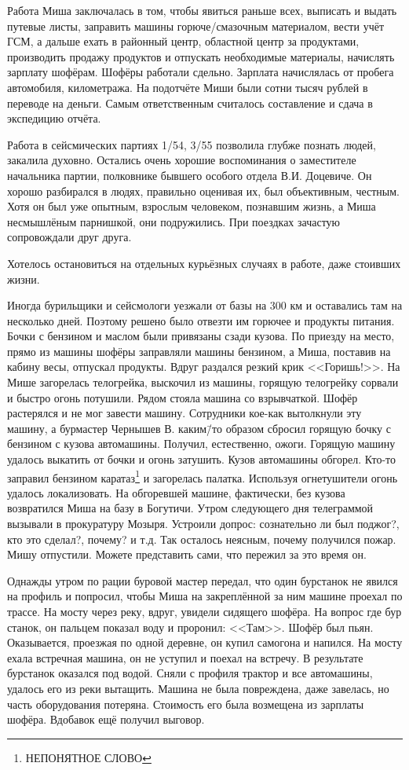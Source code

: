Работа Миша заключалась в том, чтобы явиться раньше всех, выписать и выдать путевые листы, заправить машины горюче\-/смазочным материалом, вести учёт ГСМ, а дальше ехать в районный центр, областной центр за продуктами, производить продажу продуктов и отпускать необходимые материалы, начислять зарплату шофёрам. Шофёры работали сдельно. Зарплата начислялась от пробега автомобиля, километража. На подотчёте Миши были сотни тысяч рублей в переводе на деньги. Самым ответственным считалось составление и сдача в экспедицию отчёта.

Работа в сейсмических партиях 1/54, 3/55 позволила глубже познать людей, закалила духовно. Остались очень хорошие воспоминания о заместителе начальника партии, полковнике бывшего особого отдела В.И. Доцевиче. Он хорошо разбирался в людях, правильно оценивая их, был объективным, честным. Хотя он был уже опытным, взрослым человеком, познавшим жизнь, а Миша несмышлёным парнишкой, они подружились. При поездках зачастую сопровождали друг друга.

Хотелось остановиться на отдельных курьёзных случаях в работе, даже стоивших жизни. 

Иногда бурильщики и сейсмологи уезжали от базы на 300 км и оставались там на несколько дней. Поэтому решено было отвезти им горючее и продукты питания. Бочки с бензином и маслом были привязаны сзади кузова. По приезду на место, прямо из машины шофёры заправляли машины бензином, а Миша, поставив на кабину весы, отпускал продукты. Вдруг раздался резкий крик <<Горишь!>>. На Мише загорелась телогрейка, выскочил из машины, горящую телогрейку сорвали и быстро огонь потушили. Рядом стояла машина со взрывчаткой. Шофёр растерялся и не мог завести машину. Сотрудники кое-как вытолкнули эту машину, а бурмастер Чернышев В. каким\=/то образом сбросил горящую бочку с бензином с кузова автомашины. Получил, естественно, ожоги. Горящую машину удалось выкатить от бочки и огонь затушить. Кузов автомашины обгорел. Кто-то заправил бензином каратаз\footnote{НЕПОНЯТНОЕ СЛОВО} и загорелась палатка. Используя огнетушители огонь удалось локализовать. На обгоревшей машине, фактически, без кузова возвратился Миша на базу в Богутичи. Утром следующего дня телеграммой вызывали в прокуратуру Мозыря. Устроили допрос: сознательно ли был поджог?, кто это сделал?, почему? и т.д. Так осталось неясным, почему получился пожар. Мишу отпустили. Можете представить сами, что пережил за это время он.

Однажды утром по рации буровой мастер передал, что один бурстанок не явился на профиль и попросил, чтобы Миша на закреплённой за ним машине проехал по трассе. На мосту через реку, вдруг, увидели сидящего шофёра. На вопрос где бур станок, он пальцем показал воду и проронил: <<Там>>. Шофёр был пьян. Оказывается, проезжая по одной деревне, он купил самогона и напился. На мосту ехала встречная машина, он не уступил и поехал на встречу. В результате бурстанок оказался под водой. Сняли с профиля трактор и все автомашины, удалось его из реки вытащить. Машина не была повреждена, даже завелась, но часть оборудования потеряна. Стоимость его была возмещена из зарплаты шофёра. Вдобавок ещё получил выговор. 

